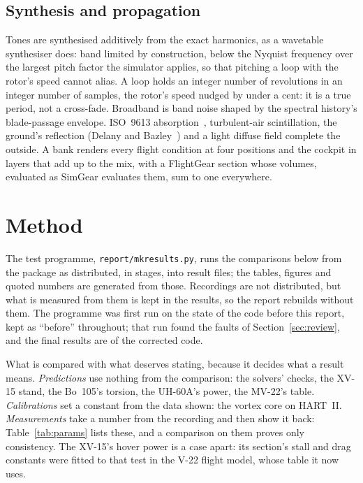\documentclass[10pt,a4paper,twocolumn]{article}
\begin{document}
\subsection{Synthesis and propagation}
Tones are synthesised additively from the exact harmonics, as a wavetable synthesiser does: band limited by construction, below the Nyquist frequency over the largest pitch factor the simulator applies, so that pitching a loop with the rotor's speed cannot alias. A loop holds an integer number of revolutions in an integer number of samples, the rotor's speed nudged by under a cent: it is a true period, not a cross-fade. Broadband is band noise shaped by the spectral history's blade-passage envelope. ISO~9613 absorption~\cite{iso}, turbulent-air scintillation, the ground's reflection (Delany and Bazley~\cite{delany}) and a light diffuse field complete the outside. A bank renders every flight condition at four positions and the cockpit in layers that add up to the mix, with a FlightGear section whose volumes, evaluated as SimGear evaluates them, sum to one everywhere.

\section{Method}\label{sec:method}
The test programme, \texttt{report/mkresults.py}, runs the comparisons below from the package as distributed, in stages, into result files; the tables, figures and quoted numbers are generated from those. Recordings are not distributed, but what is measured from them is kept in the results, so the report rebuilds without them. The programme was first run on the state of the code before this report, kept as ``before'' throughout; that run found the faults of Section~\ref{sec:review}, and the final results are of the corrected code.

What is compared with what deserves stating, because it decides what a result means. \emph{Predictions} use nothing from the comparison: the solvers' checks, the XV-15 stand, the Bo~105's torsion, the UH-60A's power, the MV-22's table. \emph{Calibrations} set a constant from the data shown: the vortex core on HART~II. \emph{Measurements} take a number from the recording and then show it back: Table~\ref{tab:params} lists these, and a comparison on them proves only consistency. The XV-15's hover power is a case apart: its section's stall and drag constants were fitted to that test in the V-22 flight model, whose table it now uses.
\end{document}
